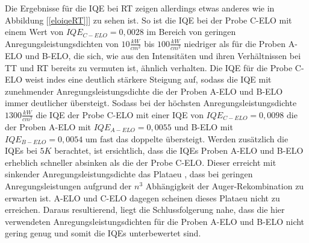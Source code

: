 \noindent 
% 
Die Ergebnisse für die IQE bei RT zeigen allerdings etwas anderes wie in Abbildung [\ref{eloiqeRT}]] zu sehen ist. So ist die 
IQE bei der Probe C-ELO mit einem Wert von $IQE_{C-ELO} = 0,0028$
im Bereich von geringen Anregungsleistungsdichten von $ 10 \frac{kW}{cm^2} $ bis $ 100 \frac{kW}{cm^2} $ niedriger als für die Proben A-ELO und B-ELO, die sich, wie aus den Intensitäten und ihren Verhältnissen bei TT und RT bereits zu vermuten ist, ähnlich verhalten. 
Die IQE für die Probe C-ELO weist indes eine deutlich stärkere Steigung auf, sodass die IQE mit zunehmender Anregungsleistungsdichte die der Proben A-ELO und B-ELO immer deutlicher übersteigt. Sodass bei der höchsten Anregungsleistungsdichte $ 1300 \frac{kW}{cm^2} $ die IQE der Probe C-ELO mit einer IQE von $IQE_{C-ELO} = 0,0098$ die der Proben A-ELO mit $IQE_{A-ELO} = 0,0055$ und B-ELO mit $IQE_{B-ELO} = 0,0054$ um fast das doppelte übersteigt. Werden zusätzlich die IQEs bei $5K$ berachtet, ist ersichtlich, dass die IQEs Proben A-ELO und B-ELO erheblich schneller absinken als die der Probe C-ELO. Dieser erreicht mit sinkender Anregungsleistungsdichte das Plataeu , dass bei geringen Anregungsleistungen aufgrund der $n^3$ Abhängigkeit der Auger-Rekombination zu erwarten ist. A-ELO und C-ELO dagegen scheinen dieses Plataeu nicht zu erreichen. Daraus resultierend, liegt die Schlussfolgerung nahe, dass die hier verwendeten Anregungsleistungsdichten für die Proben A-ELO und B-ELO nicht gering genug und somit die IQEs unterbewertet sind. 
%
